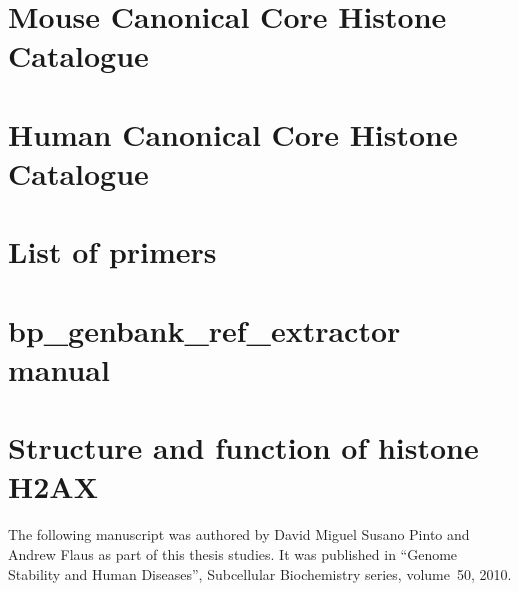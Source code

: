 \appendix

\chapter{Mouse Canonical Core Histone Catalogue}
  \label{ch:mouse-catalogue}
  \begingroup
  \newcommand{\ResultsDir}{results-mus-musculus}
  \newcommand{\FigsDir}{figs-mus-musculus}
  \newcommand{\ReferenceDir}{data/reference-mus-musculus/}
  \endgroup

\chapter{Human Canonical Core Histone Catalogue}
  \begingroup
  \newcommand{\ResultsDir}{results-homo-sapiens}
  \newcommand{\FigsDir}{figs-homo-sapiens}
  \newcommand{\ReferenceDir}{data/reference-homo-sapiens}
  \endgroup

\chapter{List of primers}
  \label{app:primers}

\chapter{bp\_genbank\_ref\_extractor manual}
  \label{app:pod-doc}
  

\chapter{Structure and function of histone H2AX}
  \label{app:h2ax-review}

  The following manuscript was authored by David Miguel Susano Pinto and
  Andrew Flaus as part of this thesis studies. It was published in ``Genome
  Stability and Human Diseases'', Subcellular Biochemistry series, volume~50,
  2010.

  
